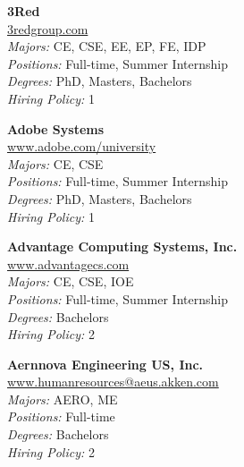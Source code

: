 \documentclass[twoside]{article}
\begin{document}
\begin{center}
\begin{multicols}{3}
\end{multicols}\end{center}\newpage{}
\begin{center}\begin{multicols}{3}
\begin{minipage}{.9\columnwidth}{\Large\bf 3Red }\\
	\url{3redgroup.com}\\
	\emph{Majors:} CE, CSE, EE, EP, FE, IDP\\
	\emph{Positions:} Full-time, Summer Internship\\
	\emph{Degrees:} PhD, Masters, Bachelors\\
	\emph{Hiring Policy:} 1\\
\end{minipage}
 
\begin{minipage}{.9\columnwidth}{\Large\bf Adobe Systems }\\
	\url{www.adobe.com/university}\\
	\emph{Majors:} CE, CSE\\
	\emph{Positions:} Full-time, Summer Internship\\
	\emph{Degrees:} PhD, Masters, Bachelors\\
	\emph{Hiring Policy:} 1\\
\end{minipage}
 
\begin{minipage}{.9\columnwidth}{\Large\bf Advantage Computing Systems, Inc. }\\
	\url{www.advantagecs.com}\\
	\emph{Majors:} CE, CSE, IOE\\
	\emph{Positions:} Full-time, Summer Internship\\
	\emph{Degrees:} Bachelors\\
	\emph{Hiring Policy:} 2\\
\end{minipage}
 
\begin{minipage}{.9\columnwidth}{\Large\bf Aernnova Engineering US, Inc. }\\
	\url{www.humanresources@aeus.akken.com}\\
	\emph{Majors:} AERO, ME\\
	\emph{Positions:} Full-time\\
	\emph{Degrees:} Bachelors\\
	\emph{Hiring Policy:} 2\\
\end{minipage}
 

\end{multicols}
\end{center}
\end{document}
